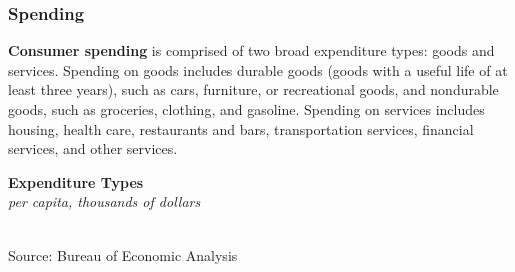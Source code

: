 \documentclass{report}
\makeatletter
\newcommand{\tbllink}[1]{\href{https://raw.githubusercontent.com/bdecon/US-chartbook/master/chartbook/data/#1}{\faTable}}
\newcommand*\short[1]{\expandafter\@gobbletwo\number\numexpr#1\relax}
\newcommand{\stdnode}[3]{\node[below, align=left, shift=({#1,#2})]{#3};}
\newcommand{\shdateaxisticks}{
		date coordinates in=x, axis line style={draw=none},
		xmax={2022-10-31},
		max space between ticks=40,	    
		xtick={{1990-01-01}, {1995-01-01}, {2000-01-01}, 
			{2005-01-01}, {2010-01-01}, {2015-01-01}, {2020-01-01}},
		minor xtick={},
		enlarge y limits={0.06}, enlarge x limits={0.01},
		}
\newcommand{\bbar}[2]{extra #1 ticks = {{#2}}, extra #1 tick labels = ,
		extra #1 tick style = {grid=major, grid style={thick, black!25}},}
\newcommand{\stdline}[4]{\addplot[very thick, no markers, color=#1] 
		table [x=#2, y=#3, col sep=comma] {#4};	}
\newcommand{\rbars}{
		\fill[color=black!10] (axis cs:{1990-07-01},\pgfkeysvalueof{/pgfplots/ymin}) rectangle 
			(axis cs:{1991-03-01}, \pgfkeysvalueof{/pgfplots/ymax});
		\fill[color=black!10] (axis cs:{2007-12-01},\pgfkeysvalueof{/pgfplots/ymin}) rectangle 
			(axis cs:{2009-07-01}, \pgfkeysvalueof{/pgfplots/ymax});
		\fill[color=black!10] (axis cs:{2001-03-01},\pgfkeysvalueof{/pgfplots/ymin}) rectangle 
			(axis cs:{2001-11-01}, \pgfkeysvalueof{/pgfplots/ymax});
		\fill[color=black!10] (axis cs:{2020-02-01},\pgfkeysvalueof{/pgfplots/ymin}) rectangle 
			(axis cs:{2020-05-01}, \pgfkeysvalueof{/pgfplots/ymax});}
\makeatother
\begin{document}
{\begin{minipage}{0.76\textwidth}
\subsubsection*{Spending}
\small \textbf{Consumer spending} is comprised of two broad expenditure types: goods and services. Spending on goods includes durable goods (goods with a useful life of at least three years), such as cars, furniture, or recreational goods, and nondurable goods, such as groceries, clothing, and gasoline. Spending on services includes housing, health care, restaurants and bars, transportation services, financial services, and other services. 
\end{minipage}
\vspace{2mm}

\begin{minipage}{0.37\textwidth}
\normalsize \textbf{Expenditure Types}\\
\footnotesize{\textit{per capita, thousands of dollars}}\\
\hspace*{-2mm} \\
\footnotesize{Source: Bureau of Economic Analysis} \hspace{8mm} \tbllink{pce_levels.csv}
\end{minipage} \hspace{8mm}
\begin{minipage}{0.33\textwidth}
\small 
\end{minipage}
\vspace{2mm}

}
\end{document}
